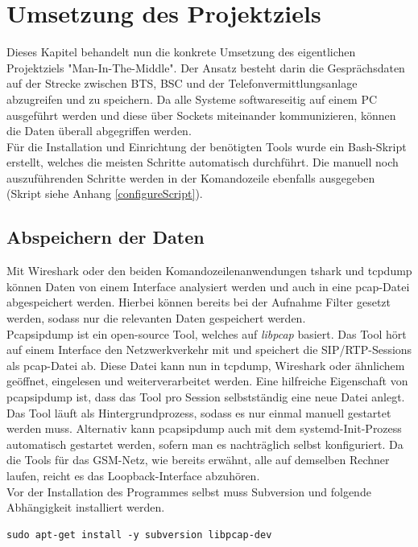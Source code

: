 \section{Umsetzung des Projektziels}\label{umsetzungProjekt}
Dieses Kapitel behandelt nun die konkrete Umsetzung des eigentlichen Projektziels "Man-In-The-Middle". Der Ansatz besteht darin die Gesprächsdaten auf der Strecke zwischen BTS, BSC und der Telefonvermittlungsanlage abzugreifen und zu speichern. Da alle Systeme softwareseitig auf einem PC ausgeführt werden und diese über Sockets miteinander kommunizieren, können die Daten überall abgegriffen werden.\\

Für die Installation und Einrichtung der benötigten Tools wurde ein Bash-Skript erstellt, welches die meisten Schritte automatisch durchführt. Die manuell noch auszuführenden Schritte werden in der Komandozeile ebenfalls ausgegeben (Skript siehe Anhang \ref{configureScript}).


\subsection{Abspeichern der Daten}\label{abspeichern}
Mit Wireshark oder den beiden Komandozeilenanwendungen tshark und tcpdump können Daten von einem Interface analysiert werden und auch in eine pcap-Datei abgespeichert werden. Hierbei können bereits bei der Aufnahme Filter gesetzt werden, sodass nur die relevanten Daten gespeichert werden.\\

Pcapsipdump ist ein open-source Tool, welches auf \textit{libpcap} basiert. Das Tool hört auf einem Interface den Netzwerkverkehr mit und speichert die SIP/RTP-Sessions als pcap-Datei ab. Diese Datei kann nun in tcpdump, Wireshark oder ähnlichem geöffnet, eingelesen und weiterverarbeitet werden. Eine hilfreiche Eigenschaft von pcapsipdump ist, dass das Tool pro Session selbstständig eine neue Datei anlegt. Das Tool läuft als Hintergrundprozess, sodass es nur einmal manuell gestartet werden muss. Alternativ kann pcapsipdump auch mit dem systemd-Init-Prozess automatisch gestartet werden, sofern man es nachträglich selbst konfiguriert. Da die Tools für das GSM-Netz, wie bereits erwähnt, alle auf demselben Rechner laufen, reicht es das Loopback-Interface abzuhören.\\

Vor der Installation des Programmes selbst muss Subversion und folgende Abhängigkeit installiert werden.
\begin{lstlisting}
sudo apt-get install -y subversion libpcap-dev
\end{lstlisting}

